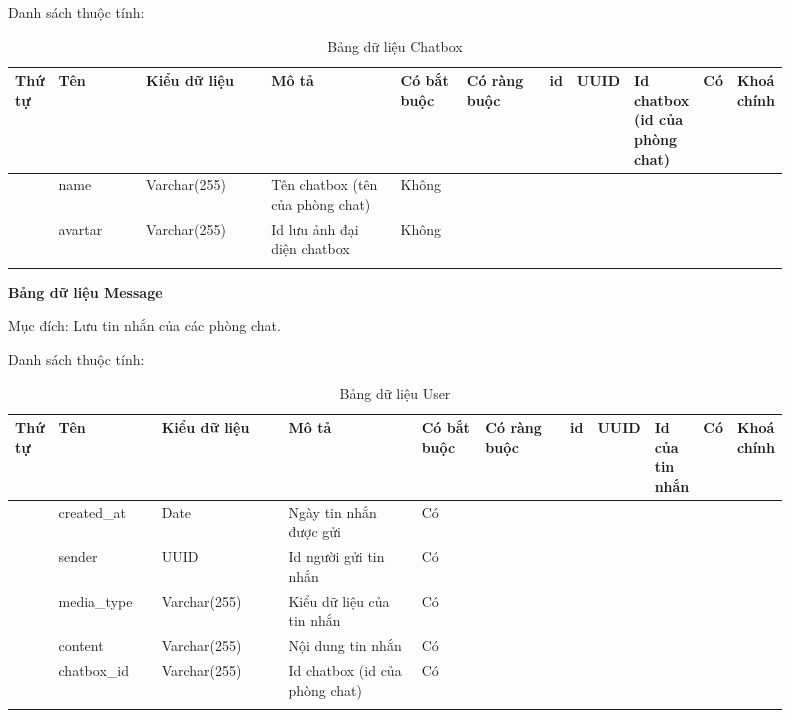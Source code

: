\documentclass[../DoAn.tex]{subfiles}
\begin{document}
Danh sách thuộc tính:
\begin{longtable}[c]{
|>{\raggedright\arraybackslash}m{0.05\linewidth}
|>{\raggedright\arraybackslash}m{0.15\linewidth}
|>{\raggedright\arraybackslash}m{0.20\linewidth}
|>{\raggedright\arraybackslash}m{0.25\linewidth}
|>{\raggedright\arraybackslash}m{0.1\linewidth}
|>{\raggedright\arraybackslash}m{0.15\linewidth}|}
\hline
\textbf{Thứ tự} & \textbf{Tên} & \textbf{Kiểu dữ liệu} & \textbf{Mô tả} & \textbf{Có bắt buộc} & \textbf{Có ràng buộc} \hline
{} & id & UUID & Id chatbox (id của phòng chat) & Có & Khoá chính \\  & name & Varchar(255) & Tên chatbox (tên của phòng chat) & Không & \\  & avartar & Varchar(255) & Id lưu ảnh đại diện chatbox & Không & \\ \hline
\caption{Bảng dữ liệu Chatbox}
\label{tab:use_case_tổng_quan}
\end{longtable}


\textbf{Bảng dữ liệu Message}

Mục đích: Lưu tin nhắn của các phòng chat.

Danh sách thuộc tính:
\begin{longtable}[c]{
|>{\raggedright\arraybackslash}m{0.05\linewidth}
|>{\raggedright\arraybackslash}m{0.15\linewidth}
|>{\raggedright\arraybackslash}m{0.20\linewidth}
|>{\raggedright\arraybackslash}m{0.25\linewidth}
|>{\raggedright\arraybackslash}m{0.1\linewidth}
|>{\raggedright\arraybackslash}m{0.15\linewidth}|}
\hline
\textbf{Thứ tự} & \textbf{Tên} & \textbf{Kiểu dữ liệu} & \textbf{Mô tả} & \textbf{Có bắt buộc} & \textbf{Có ràng buộc} \hline
{} & id & UUID & Id của tin nhắn & Có & Khoá chính \\  & created\_at & Date & Ngày tin nhắn được gửi & Có & \\  & sender & UUID & Id người gửi tin nhắn & Có & \\  & media\_type & Varchar(255) & Kiểu dữ liệu của tin nhắn & Có & \\  & content & Varchar(255) & Nội dung tin nhắn & Có & \\  & chatbox\_id & Varchar(255) & Id chatbox (id của phòng chat) & Có & \\ \hline
\caption{Bảng dữ liệu User}
\label{tab:use_case_tổng_quan}
\end{longtable}
\end{document}
